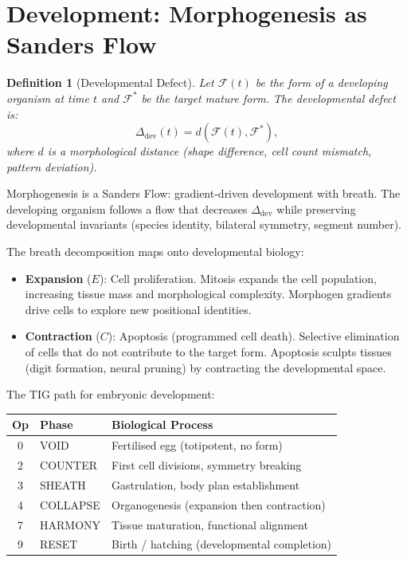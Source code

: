\documentclass[12pt, openany]{book}
\newtheorem{definition}[theorem]{Definition}
\theoremstyle{remark}
\begin{document}
\section{Development: Morphogenesis as Sanders Flow}
\label{sec:development}

\begin{definition}[Developmental Defect]
\label{def:dev-defect}
Let $\mathcal{F}(t)$ be the form of a developing organism at time $t$ and
$\mathcal{F}^*$ be the target mature form.  The developmental defect is:
\[
  \Delta_{\mathrm{dev}}(t) = d(\mathcal{F}(t), \mathcal{F}^*),
\]
where $d$ is a morphological distance (shape difference, cell count mismatch,
pattern deviation).
\end{definition}

\noindent
Morphogenesis is a Sanders Flow: gradient-driven development with breath.  The
developing organism follows a flow that decreases $\Delta_{\mathrm{dev}}$ while
preserving developmental invariants (species identity, bilateral symmetry,
segment number).

The breath decomposition maps onto developmental biology:
\begin{itemize}
  \item \textbf{Expansion} ($E$): Cell proliferation.  Mitosis expands the cell
        population, increasing tissue mass and morphological complexity.
        Morphogen gradients drive cells to explore new positional identities.
  \item \textbf{Contraction} ($C$): Apoptosis (programmed cell death).  Selective
        elimination of cells that do not contribute to the target form.
        Apoptosis sculpts tissues (digit formation, neural pruning) by
        contracting the developmental space.
\end{itemize}

\noindent
The TIG path for embryonic development:
\begin{center}
\begin{tabular}{@{}cll@{}}
\toprule
Op & Phase & Biological Process \\
\midrule
0 & VOID & Fertilised egg (totipotent, no form) \\
2 & COUNTER & First cell divisions, symmetry breaking \\
3 & SHEATH & Gastrulation, body plan establishment \\
4 & COLLAPSE & Organogenesis (expansion then contraction) \\
7 & HARMONY & Tissue maturation, functional alignment \\
9 & RESET & Birth / hatching (developmental completion) \\
\bottomrule
\end{tabular}
\end{center}
\end{document}
